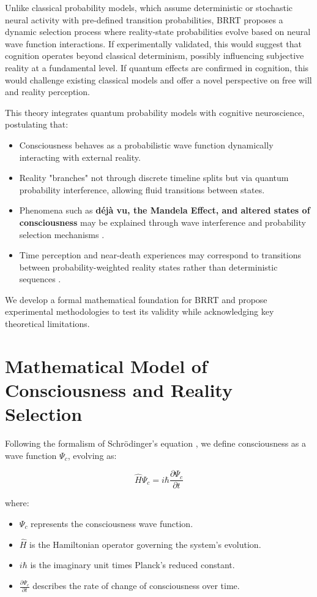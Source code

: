 \documentclass{article}
\begin{document}
Unlike classical probability models, which assume deterministic or stochastic neural activity with pre-defined transition probabilities, BRRT proposes a dynamic selection process where reality-state probabilities evolve based on neural wave function interactions. If experimentally validated, this would suggest that cognition operates beyond classical determinism, possibly influencing subjective reality at a fundamental level. If quantum effects are confirmed in cognition, this would challenge existing classical models and offer a novel perspective on free will and reality perception.

This theory integrates quantum probability models with cognitive neuroscience, postulating that:
\begin{itemize}
    \item Consciousness behaves as a probabilistic wave function dynamically interacting with external reality.
    \item Reality "branches" not through discrete timeline splits but via quantum probability interference, allowing fluid transitions between states.
    \item Phenomena such as \textbf{d\'ej\`a vu, the Mandela Effect, and altered states of consciousness} may be explained through wave interference and probability selection mechanisms \cite{psychedelic2020research}.
    \item Time perception and near-death experiences may correspond to transitions between probability-weighted reality states rather than deterministic sequences \cite{carhart2012neural}.
\end{itemize}

We develop a formal mathematical foundation for BRRT and propose experimental methodologies to test its validity while acknowledging key theoretical limitations.

\section{Mathematical Model of Consciousness and Reality Selection}

Following the formalism of Schr\"odinger's equation \cite{schrodinger1935present}, we define consciousness as a wave function $\Psi_c$, evolving as:

\begin{equation}
    \hat{H} \Psi_c = i\hbar \frac{\partial \Psi_c}{\partial t}
\end{equation}

where:
\begin{itemize}
    \item $\Psi_c$ represents the consciousness wave function.
    \item $\hat{H}$ is the Hamiltonian operator governing the system’s evolution.
    \item $i\hbar$ is the imaginary unit times Planck’s reduced constant.
    \item $\frac{\partial \Psi_c}{\partial t}$ describes the rate of change of consciousness over time.
\end{itemize}
\end{document}
